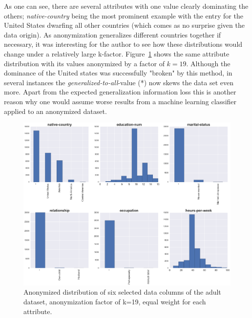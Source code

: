 \documentclass{llncs}
\begin{document}
As one can see, there are several attributes with one value clearly dominating the others; \textit{native-country} being the most prominent example with the entry for the United States dwarfing all other countries (which comes as no surprise given the data origin). As anonymization generalizes different countries together if necessary, it was interesting for the author to see how these distributions would change under a relatively large k-factor. Figure~\ref{fig:adult_anonymized_distribution} shows the same attribute distribution with its values anonymized by a factor of $k=19$. Although the dominance of the United states was successfully "broken" by this method, in several instances the \textit{generalized-to-all}-value (*) now skews the data set even more. Apart from the expected generalization information loss this is another reason why one would assume worse results from a machine learning classifier applied to an anonymized dataset.

\begin{figure}[!t]
	\begin{center}
    	\hspace*{-0.8cm}
		\includegraphics[width=1.1\textwidth]{figures/experiment/dist_anonym_small}
		\caption{Anonymized distribution of six selected data columns of the adult dataset, anonymization factor of k=19, equal weight for each attribute.}
		\label{fig:adult_anonymized_distribution}
	\end{center}
\end{figure}
\end{document}
